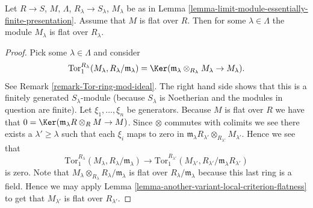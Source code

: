 \begin{lemma}
\label{lemma-colimit-eventually-flat}
Let $R \to S$, $M$, $\Lambda$, $R_\lambda \to S_\lambda$, $M_\lambda$
be as in Lemma \ref{lemma-limit-module-essentially-finite-presentation}.
Assume that $M$ is flat over $R$.
Then for some $\lambda \in \Lambda$ the module
$M_\lambda$ is flat over $R_\lambda$.
\end{lemma}

\begin{proof}
Pick some $\lambda \in \Lambda$ and consider
$$
\text{Tor}_1^{R_\lambda}(M_\lambda, R_\lambda/\mathfrak m_\lambda)
=
\Ker(\mathfrak m_\lambda \otimes_{R_\lambda} M_\lambda
\to M_\lambda).
$$
See Remark \ref{remark-Tor-ring-mod-ideal}. The right hand side
shows that this is a finitely generated $S_\lambda$-module (because
$S_\lambda$ is Noetherian and the modules in question are finite).
Let $\xi_1, \ldots, \xi_n$ be generators.
Because $M$ is flat over $R$ we
have that $0 = \Ker(\mathfrak m_\lambda R \otimes_R M \to M)$.
Since $\otimes$ commutes with colimits we see there exists
a $\lambda' \geq \lambda$ such that each $\xi_i$ maps to
zero in
$\mathfrak m_{\lambda}R_{\lambda'} \otimes_{R_{\lambda'}} M_{\lambda'}$.
Hence we see that
$$
\text{Tor}_1^{R_\lambda}(M_\lambda, R_\lambda/\mathfrak m_\lambda)
\longrightarrow
\text{Tor}_1^{R_{\lambda'}}(M_{\lambda'},
R_{\lambda'}/\mathfrak m_{\lambda}R_{\lambda'})
$$
is zero. Note that
$M_\lambda \otimes_{R_\lambda} R_\lambda/\mathfrak m_\lambda$
is flat over $R_\lambda/\mathfrak m_\lambda$ because this last
ring is a field. Hence we may apply Lemma
\ref{lemma-another-variant-local-criterion-flatness}
to get that $M_{\lambda'}$ is flat over $R_{\lambda'}$.
\end{proof}
